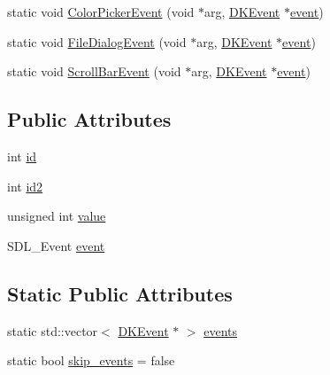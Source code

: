 \begin{DoxyCompactItemize}
\item 
static void \hyperlink{class_d_k_event_adffe2183781aba801fb8ec90370598bf}{Color\-Picker\-Event} (void $\ast$arg, \hyperlink{class_d_k_event}{D\-K\-Event} $\ast$\hyperlink{class_d_k_event_a3deebb932ed734363c4ece87971bc45f}{event})
\item 
static void \hyperlink{class_d_k_event_a15e926f6b44f003c75930d4f2b5fb988}{File\-Dialog\-Event} (void $\ast$arg, \hyperlink{class_d_k_event}{D\-K\-Event} $\ast$\hyperlink{class_d_k_event_a3deebb932ed734363c4ece87971bc45f}{event})
\item 
static void \hyperlink{class_d_k_event_a87ec7bf5f444b050e71b61d547c44db2}{Scroll\-Bar\-Event} (void $\ast$arg, \hyperlink{class_d_k_event}{D\-K\-Event} $\ast$\hyperlink{class_d_k_event_a3deebb932ed734363c4ece87971bc45f}{event})
\end{DoxyCompactItemize}
\subsection*{Public Attributes}
\begin{DoxyCompactItemize}
\item 
int \hyperlink{class_d_k_event_a46877918e12fcb3b2c8988379b6fa6fa}{id}
\item 
int \hyperlink{class_d_k_event_adf258ac2b7c2177a828c6d6aae3890e1}{id2}
\item 
unsigned int \hyperlink{class_d_k_event_ad69b28a679f94465013c7556de75ace8}{value}
\item 
S\-D\-L\-\_\-\-Event \hyperlink{class_d_k_event_a3deebb932ed734363c4ece87971bc45f}{event}
\end{DoxyCompactItemize}
\subsection*{Static Public Attributes}
\begin{DoxyCompactItemize}
\item 
static std\-::vector$<$ \hyperlink{class_d_k_event}{D\-K\-Event} $\ast$ $>$ \hyperlink{class_d_k_event_acaded8543ecfb42f8aabefd848af0b9a}{events}
\item 
static bool \hyperlink{class_d_k_event_aef512bb7dbdaf129bdc0cf428d2c2bd9}{skip\-\_\-events} = false
\end{DoxyCompactItemize}


